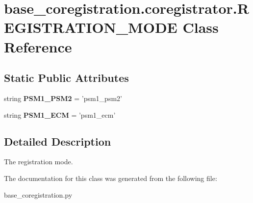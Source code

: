 \hypertarget{classbase__coregistration_1_1coregistrator_1_1REGISTRATION__MODE}{\section{base\-\_\-coregistration.\-coregistrator.\-R\-E\-G\-I\-S\-T\-R\-A\-T\-I\-O\-N\-\_\-\-M\-O\-D\-E Class Reference}
\label{classbase__coregistration_1_1coregistrator_1_1REGISTRATION__MODE}
}
\subsection*{Static Public Attributes}
\begin{DoxyCompactItemize}
\item 
\hypertarget{classbase__coregistration_1_1coregistrator_1_1REGISTRATION__MODE_a98539fedf84ca1f98c64168cd6137edc}{string {\bfseries P\-S\-M1\-\_\-\-P\-S\-M2} = 'psm1\-\_\-psm2'}\label{classbase__coregistration_1_1coregistrator_1_1REGISTRATION__MODE_a98539fedf84ca1f98c64168cd6137edc}

\item 
\hypertarget{classbase__coregistration_1_1coregistrator_1_1REGISTRATION__MODE_a799ae877f68cca5f7615751c9e5aafc2}{string {\bfseries P\-S\-M1\-\_\-\-E\-C\-M} = 'psm1\-\_\-ecm'}\label{classbase__coregistration_1_1coregistrator_1_1REGISTRATION__MODE_a799ae877f68cca5f7615751c9e5aafc2}

\end{DoxyCompactItemize}


\subsection{Detailed Description}
\begin{DoxyVerb}    The registration mode. 
\end{DoxyVerb}
 

The documentation for this class was generated from the following file\-:\begin{DoxyCompactItemize}
\item 
base\-\_\-coregistration.\-py\end{DoxyCompactItemize}

